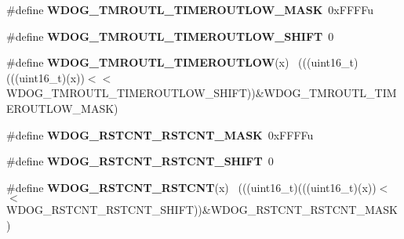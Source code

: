 \begin{DoxyCompactItemize}
\item 
\hypertarget{group___w_d_o_g___register___masks_gaf33faad844e2af36af7af5c6bf49a361}{}\#define {\bfseries W\+D\+O\+G\+\_\+\+T\+M\+R\+O\+U\+T\+L\+\_\+\+T\+I\+M\+E\+R\+O\+U\+T\+L\+O\+W\+\_\+\+M\+A\+S\+K}~0x\+F\+F\+F\+Fu\label{group___w_d_o_g___register___masks_gaf33faad844e2af36af7af5c6bf49a361}

\item 
\hypertarget{group___w_d_o_g___register___masks_gae4a9f52d3b15e28932d287dee4128e8a}{}\#define {\bfseries W\+D\+O\+G\+\_\+\+T\+M\+R\+O\+U\+T\+L\+\_\+\+T\+I\+M\+E\+R\+O\+U\+T\+L\+O\+W\+\_\+\+S\+H\+I\+F\+T}~0\label{group___w_d_o_g___register___masks_gae4a9f52d3b15e28932d287dee4128e8a}

\item 
\hypertarget{group___w_d_o_g___register___masks_gaf446de0ba58d96e3acffed206a3f6b65}{}\#define {\bfseries W\+D\+O\+G\+\_\+\+T\+M\+R\+O\+U\+T\+L\+\_\+\+T\+I\+M\+E\+R\+O\+U\+T\+L\+O\+W}(x)                        ~(((uint16\+\_\+t)(((uint16\+\_\+t)(x))$<$$<$W\+D\+O\+G\+\_\+\+T\+M\+R\+O\+U\+T\+L\+\_\+\+T\+I\+M\+E\+R\+O\+U\+T\+L\+O\+W\+\_\+\+S\+H\+I\+F\+T))\&W\+D\+O\+G\+\_\+\+T\+M\+R\+O\+U\+T\+L\+\_\+\+T\+I\+M\+E\+R\+O\+U\+T\+L\+O\+W\+\_\+\+M\+A\+S\+K)\label{group___w_d_o_g___register___masks_gaf446de0ba58d96e3acffed206a3f6b65}

\item 
\hypertarget{group___w_d_o_g___register___masks_ga1cb55a509947b315d216ed9d822a4967}{}\#define {\bfseries W\+D\+O\+G\+\_\+\+R\+S\+T\+C\+N\+T\+\_\+\+R\+S\+T\+C\+N\+T\+\_\+\+M\+A\+S\+K}~0x\+F\+F\+F\+Fu\label{group___w_d_o_g___register___masks_ga1cb55a509947b315d216ed9d822a4967}

\item 
\hypertarget{group___w_d_o_g___register___masks_gaf2ecbd74ca7b1ba60bc7b89de17b97a6}{}\#define {\bfseries W\+D\+O\+G\+\_\+\+R\+S\+T\+C\+N\+T\+\_\+\+R\+S\+T\+C\+N\+T\+\_\+\+S\+H\+I\+F\+T}~0\label{group___w_d_o_g___register___masks_gaf2ecbd74ca7b1ba60bc7b89de17b97a6}

\item 
\hypertarget{group___w_d_o_g___register___masks_gac501c4fad4e6a5710c4db132f5d67d94}{}\#define {\bfseries W\+D\+O\+G\+\_\+\+R\+S\+T\+C\+N\+T\+\_\+\+R\+S\+T\+C\+N\+T}(x)                                    ~(((uint16\+\_\+t)(((uint16\+\_\+t)(x))$<$$<$W\+D\+O\+G\+\_\+\+R\+S\+T\+C\+N\+T\+\_\+\+R\+S\+T\+C\+N\+T\+\_\+\+S\+H\+I\+F\+T))\&W\+D\+O\+G\+\_\+\+R\+S\+T\+C\+N\+T\+\_\+\+R\+S\+T\+C\+N\+T\+\_\+\+M\+A\+S\+K)\label{group___w_d_o_g___register___masks_gac501c4fad4e6a5710c4db132f5d67d94}


\end{DoxyCompactItemize}
